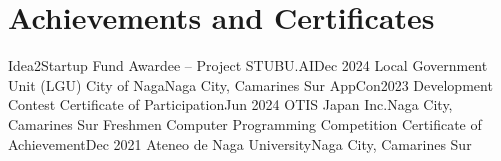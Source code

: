 \section{Achievements and Certificates}

\resumeSubHeadingListStart
    \resumeSubheading
        {Idea2Startup Fund Awardee -- Project STUBU.AI}{Dec 2024}
        {Local Government Unit (LGU) City of Naga}{Naga City, Camarines Sur}
        \resumeItemListStart
        \resumeItemListEnd
        \resumeSubheading
        {AppCon2023 Development Contest Certificate of Participation}{Jun 2024}
        {OTIS Japan Inc.}{Naga City, Camarines Sur}
        \resumeSubheading
        {Freshmen Computer Programming Competition Certificate of Achievement}{Dec 2021}
        {Ateneo de Naga University}{Naga City, Camarines Sur}
        \resumeItemListStart
        \resumeItemListEnd
\resumeSubHeadingListEnd